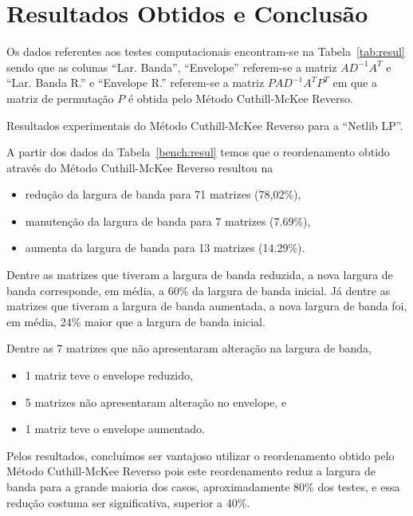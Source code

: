 \section{Resultados Obtidos e Conclusão}
Os dados referentes aos testes computacionais encontram-se na
Tabela~\ref{tab:resul} sendo que as colunas ``Lar. Banda'', ``Envelope''
referem-se a matriz $A D^{-1} A^T$ e ``Lar. Banda R.'' e ``Envelope R.''
referem-se a matriz $P A D^{-1} A^T P^T$ em que a matriz de permutação $P$ é
obtida pelo Método Cuthill-McKee Reverso.
\begin{table}
    \centering
    \caption{Resultados experimentais do Método Cuthill-McKee Reverso para
    a ``Netlib LP''.}
    \label{tab:resul}
\end{table}
\begin{table}
    \centering
\end{table}

A partir dos dados da Tabela~\ref{bench:resul} temos que o reordenamento obtido
através do Método Cuthill-McKee Reverso resultou na
\begin{itemize}
    \item redução da largura de banda para 71 matrizes (78,02\%),
    \item manutenção da largura de banda para 7 matrizes (7.69\%),
    \item aumenta da largura de banda para 13 matrizes (14.29\%).
\end{itemize}

Dentre as matrizes que tiveram a largura de banda reduzida, a nova largura de
banda corresponde, em média, a 60\% da largura de banda inicial. Já dentre as
matrizes que tiveram a largura de banda aumentada, a nova largura de banda foi,
em média, 24\% maior que a largura de banda inicial.

Dentre as 7 matrizes que não apresentaram alteração na largura de banda,
\begin{itemize}
    \item 1 matriz teve o envelope reduzido,
    \item 5 matrizes não apresentaram alteração no envelope, e
    \item 1 matriz teve o envelope aumentado.
\end{itemize}

Pelos resultados, concluímos ser vantajoso utilizar o reordenamento obtido pelo
Método Cuthill-McKee Reverso pois este reordenamento reduz a largura de banda
para a grande maioria dos casos, aproximadamente 80\% dos testes, e essa
redução costuma ser significativa, superior a 40\%.
